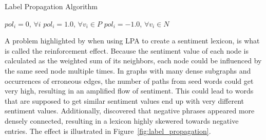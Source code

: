 \begin{algorithm}
	\DontPrintSemicolon
    \caption{Label Propagation Algorithm}
    \label{alg:label_propagation}
    
    $pol_i = 0$, $\forall i$\;
	$pol_i = 1.0$, $\forall v_i \in P$\;
    $pol_i = -1.0$, $\forall v_i \in N$\;

\end{algorithm}

A problem highlighted by \cite{Velikovich2010} when using LPA to create a sentiment lexicon, is what is called the reinforcement effect. Because the sentiment value of each node is calculated as the weighted sum of its neighbors, each node could be influenced by the same seed node multiple times. In graphs with many dense subgraphs and occurrences of erroneous edges, the number of paths from seed words could get very high, resulting in an amplified flow of sentiment. This could lead to words that are supposed to get similar sentiment values end up with very different sentiment values. Additionally, \citeauthor{Velikovich2010} discovered that negative phrases appeared more densely connected, resulting in a lexicon highly skewered towards negative entries. The effect is illustrated in Figure~\ref{fig:label_propagation}.


